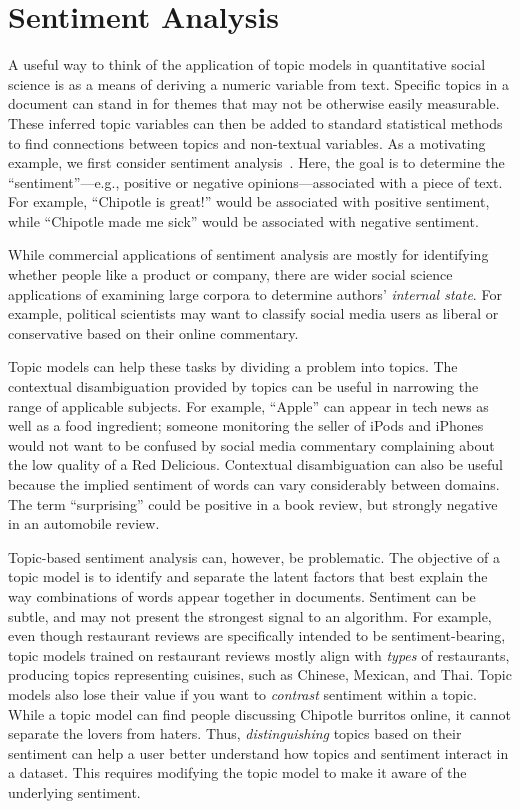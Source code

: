 \section{Sentiment Analysis}

A useful way to think of the application of topic models in quantitative social science is as a means of deriving a numeric variable from text.
Specific topics in a document can stand in for themes that may not be otherwise easily measurable.
These inferred topic variables can then be added to standard statistical methods to find connections between topics and non-textual variables.
As a motivating example, we first consider sentiment analysis~\citep{pang-08}.  Here, the goal is to determine the
``sentiment''---e.g., positive or negative opinions---associated with
a piece of text.  For example, ``Chipotle is great!'' would be
associated with positive sentiment, while ``Chipotle made me sick''
would be associated with negative sentiment.

While commercial applications of sentiment analysis are mostly for
identifying whether people like a product or company, there are wider
social science applications of examining large corpora to determine
authors' \emph{internal state}.  For example, political scientists may
want to classify social media users as liberal or conservative based on their online
commentary.

Topic models can help these tasks by dividing a problem into topics.
The contextual disambiguation provided by topics can be useful in 
narrowing the range of applicable subjects.
For example, ``Apple'' can appear in tech news as well as a food
ingredient; someone monitoring the seller of iPods and iPhones would
not want to be confused by social media commentary complaining about 
the low quality of a Red Delicious. 
Contextual disambiguation can also be useful because the implied sentiment of words 
can vary considerably between domains.
The term ``surprising'' could be positive in a book review, but 
strongly negative in an automobile review.

Topic-based sentiment analysis can, however, be problematic.
The objective of a topic model is to identify and separate the latent factors that best explain the way combinations of words appear together in documents.
Sentiment can be subtle, and may not present the strongest signal to an algorithm.
For example, even though restaurant reviews are specifically intended to be sentiment-bearing, topic models trained on restaurant reviews mostly align with {\em types} of restaurants, producing topics representing cuisines, such as Chinese, Mexican, and Thai.
Topic models also lose their value if you want to \emph{contrast}
sentiment within a topic.  While a topic model can find people
discussing Chipotle burritos online, it cannot separate the lovers from
haters.  Thus, \emph{distinguishing} topics based on their sentiment
can help a user better understand how topics and sentiment interact in
a dataset.  This requires modifying the topic model to make it aware
of the underlying sentiment.

